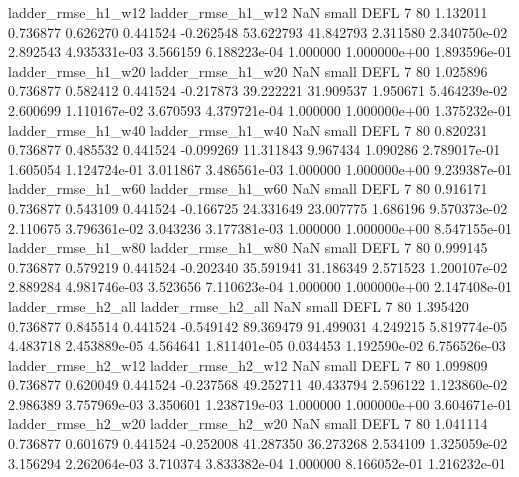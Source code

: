       ladder_rmse_h1_w12       ladder_rmse_h1_w12                   NaN      small     DEFL                 7 80 1.132011       0.736877 0.626270       0.441524   -0.262548     53.622793     41.842793     2.311580   2.340750e-02  2.892543 4.935331e-03     3.566159   6.188223e-04            1.000000    1.000000e+00        1.893596e-01
      ladder_rmse_h1_w20       ladder_rmse_h1_w20                   NaN      small     DEFL                 7 80 1.025896       0.736877 0.582412       0.441524   -0.217873     39.222221     31.909537     1.950671   5.464239e-02  2.600699 1.110167e-02     3.670593   4.379721e-04            1.000000    1.000000e+00        1.375232e-01
      ladder_rmse_h1_w40       ladder_rmse_h1_w40                   NaN      small     DEFL                 7 80 0.820231       0.736877 0.485532       0.441524   -0.099269     11.311843      9.967434     1.090286   2.789017e-01  1.605054 1.124724e-01     3.011867   3.486561e-03            1.000000    1.000000e+00        9.239387e-01
      ladder_rmse_h1_w60       ladder_rmse_h1_w60                   NaN      small     DEFL                 7 80 0.916171       0.736877 0.543109       0.441524   -0.166725     24.331649     23.007775     1.686196   9.570373e-02  2.110675 3.796361e-02     3.043236   3.177381e-03            1.000000    1.000000e+00        8.547155e-01
      ladder_rmse_h1_w80       ladder_rmse_h1_w80                   NaN      small     DEFL                 7 80 0.999145       0.736877 0.579219       0.441524   -0.202340     35.591941     31.186349     2.571523   1.200107e-02  2.889284 4.981746e-03     3.523656   7.110623e-04            1.000000    1.000000e+00        2.147408e-01
      ladder_rmse_h2_all       ladder_rmse_h2_all                   NaN      small     DEFL                 7 80 1.395420       0.736877 0.845514       0.441524   -0.549142     89.369479     91.499031     4.249215   5.819774e-05  4.483718 2.453889e-05     4.564641   1.811401e-05            0.034453    1.192590e-02        6.756526e-03
      ladder_rmse_h2_w12       ladder_rmse_h2_w12                   NaN      small     DEFL                 7 80 1.099809       0.736877 0.620049       0.441524   -0.237568     49.252711     40.433794     2.596122   1.123860e-02  2.986389 3.757969e-03     3.350601   1.238719e-03            1.000000    1.000000e+00        3.604671e-01
      ladder_rmse_h2_w20       ladder_rmse_h2_w20                   NaN      small     DEFL                 7 80 1.041114       0.736877 0.601679       0.441524   -0.252008     41.287350     36.273268     2.534109   1.325059e-02  3.156294 2.262064e-03     3.710374   3.833382e-04            1.000000    8.166052e-01        1.216232e-01
